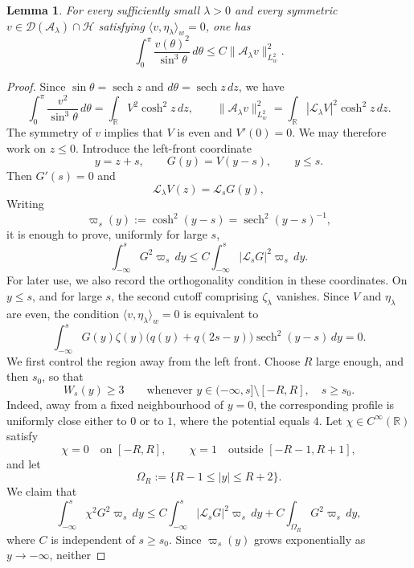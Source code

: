 \documentclass[11pt,a4paper]{article}
\DeclareMathOperator{\sech}{sech}
\numberwithin{equation}{section}
\theoremstyle{plain}
\newtheorem{lemma}[theorem]{Lemma}
\theoremstyle{remark}
\begin{document}
\begin{lemma}\label{weightedAlambda}
For every sufficiently small $\lambda>0$ and every symmetric $v\in\mathcal D(\mathcal A_\lambda)\cap\mathcal H$ satisfying $\langle v,\eta_\lambda\rangle_w=0$, one has
$$
\int_0^\pi\frac{v(\theta)^2}{\sin^3\theta}\,d\theta
\leq
C\|\mathcal A_\lambda v\|_{L_w^2}^2.
$$
\end{lemma}
\begin{proof}
Since $\sin\theta=\sech z$ and $d\theta=\sech z\,dz$, we have
$$
\int_0^\pi\frac{v^2}{\sin^3\theta}\,d\theta
=
\int_{\mathbb R}V^2\cosh^2z\,dz,
\qquad
\|\mathcal A_\lambda v\|_{L_w^2}^2
=
\int_{\mathbb R}|\mathscr L_\lambda V|^2\cosh^2z\,dz.
$$
The symmetry of $v$ implies that $V$ is even and $V'(0)=0$.
We may therefore work on $z\leq0$. Introduce the left-front
coordinate
$$
y=z+s,
\qquad
G(y)=V(y-s),
\qquad
y\leq s.
$$
Then $G'(s)=0$ and
$$
\mathscr L_\lambda V(z)=\mathscr L_sG(y),
$$
Writing
$$
\varpi_s(y):=\cosh^2(y-s)=\sech^2(y-s)^{-1},
$$
it is enough to prove, uniformly for large $s$,
\begin{equation}\label{halflineweightest}
\int_{-\infty}^sG^2\varpi_s\,dy
\leq
C\int_{-\infty}^s|\mathscr L_sG|^2\varpi_s\,dy.
\end{equation}
For later use, we also record the orthogonality condition in these
coordinates. On $y\leq s$, and for large $s$, the second cutoff
comprising $\zeta_\lambda$ vanishes. Since $V$ and
$\eta_\lambda$ are even, the condition
$\langle v,\eta_\lambda\rangle_w=0$ is equivalent to
\begin{equation}\label{halflineweightorth}
\int_{-\infty}^s
G(y)\zeta(y)
\bigl(q(y)+q(2s-y)\bigr)
\sech^2(y-s)\,dy
=
0.
\end{equation}
We first control the region away from the left front. Choose $R$
large enough, and then $s_0$, so that
$$
W_s(y)\geq3
\qquad
\text{whenever }
y\in(-\infty,s]\setminus[-R,R],
\quad s\geq s_0.
$$
Indeed, away from a fixed neighbourhood of $y=0$, the corresponding profile is uniformly close either to $0$ or to $1$, where the
potential equals $4$.
Let $\chi\in C^\infty(\mathbb R)$ satisfy
$$
\chi=0\quad\text{on }[-R,R],
\qquad
\chi=1\quad\text{outside }[-R-1,R+1],
$$
and let
$$
\Omega_R:=\{R-1\leq|y|\leq R+2\}.
$$
We claim that
\begin{equation}\label{exteriorest}
\int_{-\infty}^s\chi^2G^2\varpi_s\,dy
\leq
C\int_{-\infty}^s|\mathscr L_sG|^2\varpi_s\,dy
+
C\int_{\Omega_R}G^2\varpi_s\,dy,
\end{equation}
where $C$ is independent of $s\geq s_0$.
Since $\varpi_s(y)$ grows exponentially as $y\to-\infty$, neither

\end{proof}
\end{document}
